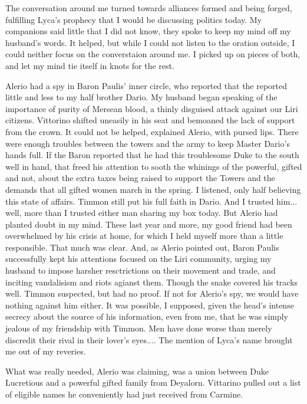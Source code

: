 \documentclass{article}
\begin{document}
The conversation around me turned towards alliances formed and being forged, fulfilling Lyca's prophecy that I would be discussing politics today. My companions said little that I did not know, they spoke to keep my mind off my husband's words. It helped, but while I could not listen to the oration outside, I could neither focus on the converstaion around me. I picked up on pieces of both, and let my mind tie itself in knots for the rest.

Alerio had a spy in Baron Paulis' inner circle, who reported that the reported little and less to my half brother Dario. My husband began speaking of the importance of purity of Mersean blood, a thinly disguised attack against our Liri citizens. Vittorino shifted uneasily in his seat and bemoaned the lack of support from the crown. It could not be helped, explained Alerio, with pursed lips. There were enough troubles between the towers and the army to keep Master Dario's hands full. If the Baron reported that he had this troublesome Duke to the south well in hand, that freed his attention to sooth the whinings of the powerful, gifted and not, about the extra taxes being raised to support the Towers and the demands that all gifted women march in the spring. I listened, only half believing this state of affairs. Timmon still put his full faith in Dario. And I trusted him... well, more than I trusted either man sharing my box today. But Alerio had planted doubt in my mind. These last year and more, my good friend had been overwhelmed by his crisis at home, for which I held myself more than a little responsible. That much was clear. And, as Alerio pointed out, Baron Paulis successfully kept his attentions focused on the Liri community, urging my husband to impose harsher resctrictions on their movement and trade, and inciting vandalisism and riots agianst them. Though the snake covered his tracks well. Timmon suspected, but had no proof. If not for Alerio's spy, we would have nothing against him either. It was possible, I supposed, given the head's intense secrecy about the source of his information, even from me, that he was simply jealous of my friendship with Timmon. Men have done worse than merely discredit their rival in their lover's eyes.... The mention of Lyca's name brought me out of my reveries.

What was really needed, Alerio was claiming, was a union between Duke Lucretious and a powerful gifted family from Deyalorn. Vittarino pulled out a list of eligible names he conveniently had just received from Carmine.
\end{document}
